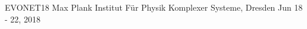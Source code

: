 \documentclass[a0,portrait]{a0poster}
\begin{document}


\begin{minipage}{\linewidth}
\Large EVONET18 \hfill Max Plank Institut Für Physik Komplexer Systeme, Dresden \hfill Jun 18 - 22, 2018 \\ [1cm]
\end{minipage}
\end{document}
